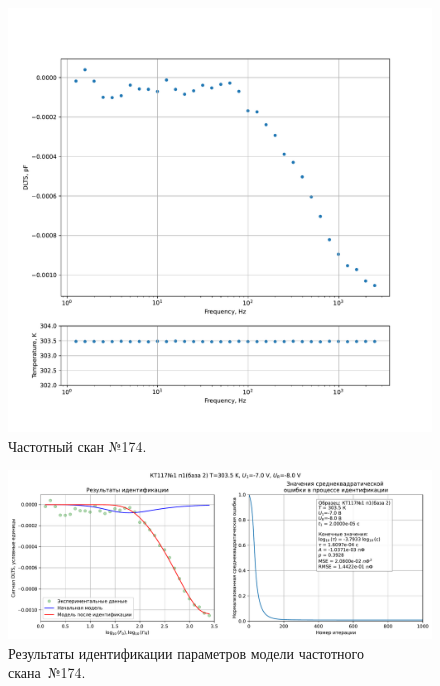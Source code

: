 \begin{figure}[!ht]
    \centering
    \includegraphics[width=1\textwidth]{../plots/КТ117№1_п1(база 2)_2500Гц-1Гц_1пФ_+30С_-7В-8В_20мВ_20мкс_шаг_0,1.pdf}
    \caption{Частотный скан №174.}
    \label{pic:frequency_scan_174}
\end{figure}

\begin{figure}[!ht]
    \centering
    \includegraphics[width=1\textwidth]{../plots/КТ117№1_п1(база 2)_2500Гц-1Гц_1пФ_+30С_-7В-8В_20мВ_20мкс_шаг_0,1_model.pdf}
    \caption{Результаты идентификации параметров модели частотного скана~№174.}
    \label{pic:frequency_scan_model174}
\end{figure}

\pagebreak



